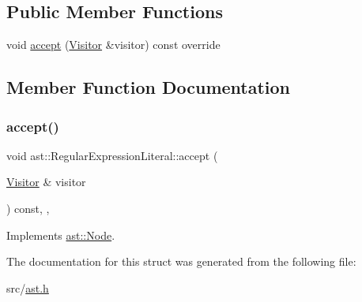\subsection*{Public Member Functions}
\begin{DoxyCompactItemize}
\item 
void \hyperlink{structast_1_1_regular_expression_literal_a9c7a0f861cceb2eee93a420955f54e36}{accept} (\hyperlink{structast_1_1_visitor}{Visitor} \&visitor) const override
\end{DoxyCompactItemize}


\subsection{Member Function Documentation}
\mbox{\label{structast_1_1_regular_expression_literal_a9c7a0f861cceb2eee93a420955f54e36}} 
\subsubsection{\texorpdfstring{accept()}{accept()}}
{\footnotesize\ttfamily void ast\+::\+Regular\+Expression\+Literal\+::accept (\begin{DoxyParamCaption}\item[{\hyperlink{structast_1_1_visitor}{Visitor} \&}]{visitor }\end{DoxyParamCaption}) const\hspace{0.3cm}{\ttfamily [inline]}, {\ttfamily [override]}, {\ttfamily [virtual]}}



Implements \hyperlink{structast_1_1_node_abc089ee6caaf06a4445ebdd8391fdebc}{ast\+::\+Node}.



The documentation for this struct was generated from the following file\+:\begin{DoxyCompactItemize}
\item 
src/\hyperlink{ast_8h}{ast.\+h}\end{DoxyCompactItemize}
